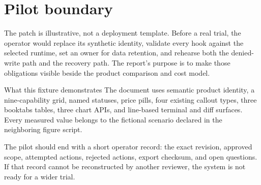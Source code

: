 \documentclass[publication-type=technical-report,theme=operator]{reportkit}
\begin{document}
\clearpage
\section{Pilot boundary}
The patch is illustrative, not a deployment template. Before a real trial,
the operator would replace its synthetic identity, validate every hook
against the selected runtime, set an owner for data retention, and rehearse
both the denied-write path and the recovery path. The report's purpose is to
make those obligations visible beside the product comparison and cost model.

\begin{evidencenote}{What this fixture demonstrates}
The document uses semantic product identity, a nine-capability grid, named
statuses, price pills, four existing callout types, three booktabs tables,
three chart APIs, and line-based terminal and diff surfaces. Every measured
value belongs to the fictional scenario declared in the neighboring figure
script.
\end{evidencenote}

The pilot should end with a short operator record: the exact revision,
approved scope, attempted actions, rejected actions, export checksum, and
open questions. If that record cannot be reconstructed by another reviewer,
the system is not ready for a wider trial.
\end{document}
